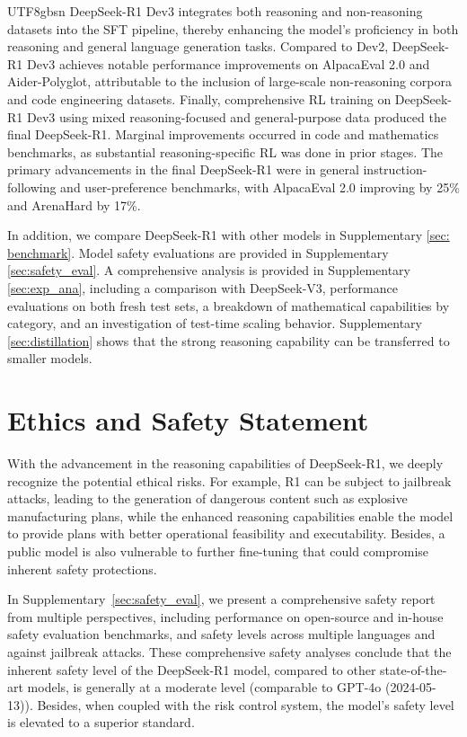 \documentclass[11pt, a4paper, logo, copyright, nonumbering]{deepseek}
\begin{document}
\begin{CJK*}{UTF8}{gbsn}
 DeepSeek-R1 Dev3 integrates both reasoning and non-reasoning datasets into the SFT pipeline, thereby enhancing the model’s proficiency in both reasoning and general language generation tasks. Compared to Dev2, DeepSeek-R1 Dev3 achieves notable performance improvements on AlpacaEval 2.0 and Aider-Polyglot, attributable to the inclusion of large-scale non-reasoning corpora and code engineering datasets. Finally, comprehensive RL training on DeepSeek-R1 Dev3 using mixed reasoning-focused and general-purpose data produced the final DeepSeek-R1. Marginal improvements occurred in code and mathematics benchmarks, as substantial reasoning-specific RL was done in prior stages. The primary advancements in the final DeepSeek-R1 were in general instruction-following and user-preference benchmarks, with AlpacaEval 2.0 improving by 25\% and ArenaHard by 17\%.

    In addition, we compare DeepSeek-R1 with other models in Supplementary \ref{sec: benchmark}. Model safety evaluations are provided in Supplementary \ref{sec:safety_eval}. 
    A comprehensive analysis is provided in Supplementary \ref{sec:exp_ana}, including a comparison with DeepSeek-V3, performance evaluations on both fresh test sets, a breakdown of mathematical capabilities by category, and an investigation of test-time scaling behavior. Supplementary \ref{sec:distillation} shows that the strong reasoning capability can be transferred to smaller models. 

\section{Ethics and Safety Statement}
With the advancement in the reasoning capabilities of DeepSeek-R1, we deeply recognize the potential ethical risks. For example, R1 can be subject to jailbreak attacks, leading to the generation of dangerous content such as explosive manufacturing plans, while the enhanced reasoning capabilities enable the model to provide plans with better operational feasibility and executability.
 Besides, a public model is also vulnerable to further fine-tuning that could compromise inherent safety protections.
 
In Supplementary~\ref{sec:safety_eval}, we present a comprehensive safety report from multiple perspectives, including performance on open-source and in-house safety evaluation benchmarks, and safety levels across multiple languages and against jailbreak attacks. These comprehensive safety analyses conclude that the inherent safety level of the DeepSeek-R1 model, compared to other state-of-the-art models, is generally at a moderate level (comparable to GPT-4o (2024-05-13)). Besides, when coupled with the risk control system, the model's safety level is elevated to a superior standard.


\end{CJK*}
\end{document}
